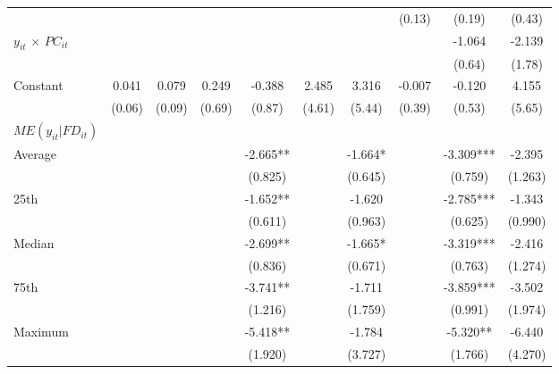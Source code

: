\documentclass[12pt, a4paper]{article}
\begin{document}
\begin{table}
\begin{threeparttable}
{\begin{tabular}{l*{9}{c}}
				&                     &                     &                     &                     &                     &                     &      (0.13)         &      (0.19)         &      (0.43)         \\
				$y_{it}$ $\times$ $PC_{it}$ &                     &                     &                     &                     &                     &                     &                     &      -1.064         &      -2.139         \\
				&                     &                     &                     &                     &                     &                     &                     &      (0.64)         &      (1.78)         \\
				Constant            &       0.041         &       0.079         &       0.249         &      -0.388         &       2.485         &       3.316         &      -0.007         &      -0.120         &       4.155         \\
				&      (0.06)         &      (0.09)         &      (0.69)         &      (0.87)         &      (4.61)         &      (5.44)         &      (0.39)         &      (0.53)         &      (5.65)         \\
				\hline
				$ME(y_{it}|FD_{it})$ \\
				Average&&&&	-2.665** 	&&	-1.664*	 &&	-3.309***	&	-2.395\\
				&&&&(0.825)   &&		(0.645)	 &&	(0.759)   	&	(1.263)\\
				
				25th&&&&	-1.652** &&		-1.620	 &&	-2.785***	&	-1.343\\
				&&&&(0.611)  && 		(0.963)	&& 	(0.625)   	&	(0.990)\\
				
				Median&&&&	-2.699** 	&&	-1.665*	 &&	-3.319***	&	-2.416\\
				&&&&(0.836)   &&		(0.671)	 &&	(0.763)   &		(1.274)\\
				
				75th&&&&	-3.741** &&		-1.711	 &&	-3.859***	&	-3.502\\
				&&&&(1.216)   &&		(1.759)	&&	(0.991)   	&	(1.974)\\
				
				Maximum	&&&&-5.418** 	&&	-1.784	 &&	-5.320** &		-6.440\\
				&&&&(1.920)  &&		(3.727)	 &&	(1.766)  & 		(4.270)\\
				

\end{tabular}}
\end{threeparttable}
\end{table}
\end{document}
